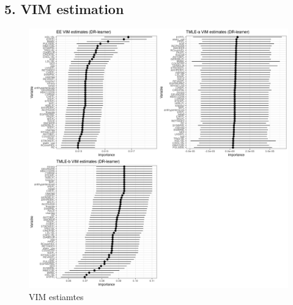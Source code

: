 \documentclass[
]{article}
\begin{document}
\hypertarget{vim-estimation}{%
\subsection{5. VIM estimation}\label{vim-estimation}}

\begin{figure}[H]

{\centering \includegraphics[width=1\linewidth]{plot/p_theta_all} 

}

\caption{VIM estiamtes}\label{fig:unnamed-chunk-17}
\end{figure}
\end{document}
